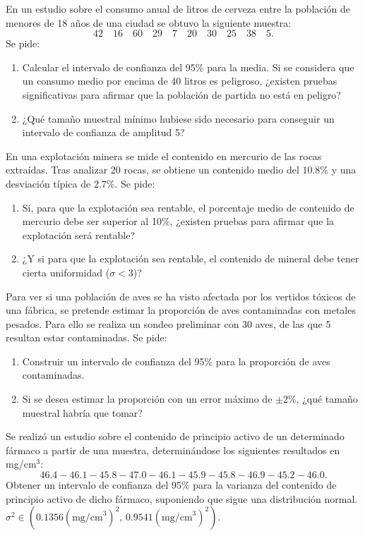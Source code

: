 {En un estudio sobre el consumo anual de litros de cerveza entre la población de menores de 18 años de una ciudad se
obtuvo la siguiente muestra: 
\[ 42\quad 16\quad 60\quad 29\quad 7\quad 20\quad 30\quad 25\quad 38\quad 5.\]
Se pide:
\begin{enumerate}
\item Calcular el intervalo de confianza del 95\% para la media. Si se considera que un consumo medio por encima de 40
litros es peligroso, ¿existen pruebas significativas para afirmar que la población de partida no está en peligro?
\item ¿Qué tamaño muestral mínimo hubiese sido necesario para conseguir un intervalo de confianza de amplitud 5?
\end{enumerate}
}
{}
{}


{En una explotación minera se mide el contenido en mercurio de las rocas extraídas.
Tras analizar 20 rocas, se obtiene un contenido medio del $10.8\%$ y una desviación típica de $2.7\%$. Se pide: 
\begin{enumerate}
\item Si, para que la explotación sea rentable, el porcentaje medio de contenido de mercurio debe ser superior al
10\%, ¿existen pruebas para afirmar que la explotación será rentable?
\item ¿Y si para que la explotación sea rentable, el contenido de mineral debe tener cierta uniformidad ($\sigma<3$)?
\end{enumerate}
}
{}
{}


{Para ver si una población de aves se ha visto afectada por los vertidos tóxicos de una fábrica, se pretende estimar
la proporción de aves contaminadas con metales pesados.
Para ello se realiza un sondeo preliminar con 30 aves, de las que 5 resultan estar contaminadas.
Se pide:
\begin{enumerate}
\item Construir un intervalo de confianza del 95\% para la proporción de aves contaminadas.
\item Si se desea estimar la proporción con un error máximo de $\pm 2\%$, ¿qué tamaño muestral habría que tomar?
\end{enumerate}
}
{}
{}


{Se realizó un estudio sobre el contenido de principio activo de un determinado fármaco a partir de una muestra,
determinándose los siguientes resultados en mg/cm$^{3}$:
\[ 46.4-46.1-45.8-47.0-46.1-45.9-45.8-46.9-45.2-46.0. \]
Obtener un intervalo de confianza del 95\% para la varianza del contenido de principio activo de dicho fármaco,
suponiendo que sigue una distribución normal.
}
{
$\sigma^2 \in (0.1356(\text{mg/cm}^3)^2,\,0.9541(\text{mg/cm}^3)^2)$.
}
{}


